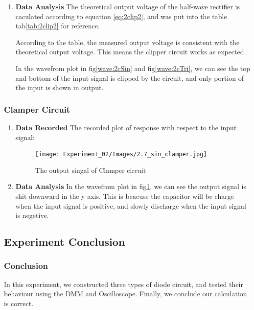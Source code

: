\begin{enumerate}[I]
        \item \textbf{Data Analysis}\newline
            The theoretical output voltage of the half-wave rectifier is caculated according to equation \ref{eq:2clip2}, and was put into the table tab\ref{tab:2clip2} for reference.\par

            According to the table, the measured output voltage is consistent with the theoretical output voltage. This means the clipper circuit works as expected.\par

            In the wavefrom plot in fig\ref{wave:2cSin} and fig\ref{wave:2cTri}, we can see the top and bottom of the input signal is clipped by the circuit, and only portion of the input is shown in output.\par
    \end{enumerate}

    \subsubsection{Clamper Circuit}
    \begin{enumerate}[I]
        \item \textbf{Data Recorded}\newline
            The recorded plot of response with respect to the input signal:
        \begin{figure}[H]
            \centering
            \texttt{[image: Experiment\_02/Images/2.7\_sin\_clamper.jpg]}
            \caption{The output singal of Clamper circuit}
            \label{wave:2dSin}
        \end{figure}
        
        \item \textbf{Data Analysis}\newline
            In the wavefrom plot in fig\ref{wave:2dSin}, we can see the output signal is shit downward in the y axis. This is beacuse the capacitor will be charge when the input signal is positive, and slowly discharge when the input signal is negetive.\par
    \end{enumerate}
    
\subsection{Experiment Conclusion}
    \subsubsection{Conclusion}
    In this experiment, we constructed three types of diode circuit, and tested their behaviour using the DMM and Oscilloscope. Finally, we conclude our calculation is correct.